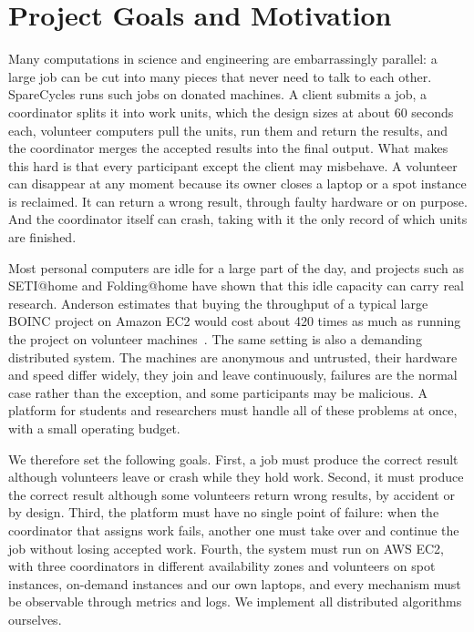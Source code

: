\section{Project Goals and Motivation}
\label{sec:goals}

Many computations in science and engineering are embarrassingly parallel: a large job can be cut into many pieces that never need to talk to each other. SpareCycles runs such jobs on donated machines. A client submits a job, a coordinator splits it into work units, which the design sizes at about 60 seconds each, volunteer computers pull the units, run them and return the results, and the coordinator merges the accepted results into the final output. What makes this hard is that every participant except the client may misbehave. A volunteer can disappear at any moment because its owner closes a laptop or a spot instance is reclaimed. It can return a wrong result, through faulty hardware or on purpose. And the coordinator itself can crash, taking with it the only record of which units are finished.

Most personal computers are idle for a large part of the day, and projects such as SETI@home and Folding@home have shown that this idle capacity can carry real research. Anderson estimates that buying the throughput of a typical large BOINC project on Amazon EC2 would cost about 420 times as much as running the project on volunteer machines~\cite{anderson2020boinc}. The same setting is also a demanding distributed system. The machines are anonymous and untrusted, their hardware and speed differ widely, they join and leave continuously, failures are the normal case rather than the exception, and some participants may be malicious. A platform for students and researchers must handle all of these problems at once, with a small operating budget.

We therefore set the following goals. First, a job must produce the correct result although volunteers leave or crash while they hold work. Second, it must produce the correct result although some volunteers return wrong results, by accident or by design. Third, the platform must have no single point of failure: when the coordinator that assigns work fails, another one must take over and continue the job without losing accepted work. Fourth, the system must run on AWS EC2, with three coordinators in different availability zones and volunteers on spot instances, on-demand instances and our own laptops, and every mechanism must be observable through metrics and logs. We implement all distributed algorithms ourselves.

